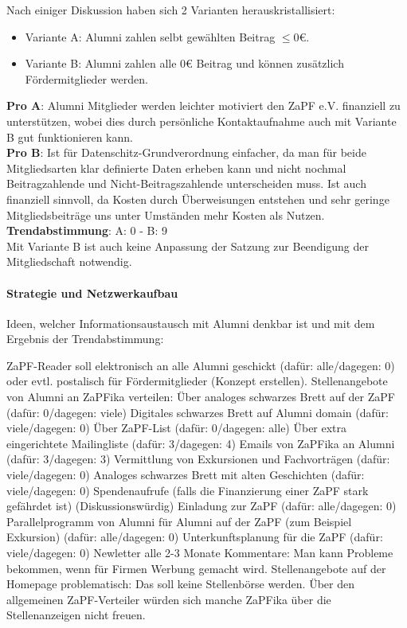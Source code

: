       Nach einiger Diskussion haben sich 2 Varianten herauskristallisiert:
      \begin{itemize}
        \item Variante A: Alumni zahlen selbt gewählten Beitrag $\leq 0 \euro$.
        \item Variante B: Alumni zahlen alle $0 \euro$ Beitrag und können zusätzlich Fördermitglieder werden.
      \end{itemize}
      \textbf{Pro A}: Alumni Mitglieder werden leichter motiviert den ZaPF e.V. finanziell zu unterstützen, wobei dies durch persönliche Kontaktaufnahme auch mit Variante B gut funktionieren kann. \\
      \textbf{Pro B}: Ist für Datenschitz-Grundverordnung einfacher, da man für beide Mitgliedsarten klar definierte Daten erheben kann und nicht nochmal Beitragzahlende und Nicht-Beitragszahlende unterscheiden muss. Ist auch finanziell sinnvoll, da Kosten durch Überweisungen entstehen und sehr geringe Mitgliedsbeiträge uns unter Umständen mehr Kosten als Nutzen. \\

      \textbf{Trendabstimmung}: A: 0 -  B: 9 \\

      Mit Variante B ist auch keine Anpassung der Satzung zur Beendigung der Mitgliedschaft notwendig. \\

      \paragraph{Strategie und Netzwerkaufbau}
        Ideen, welcher Informationsaustausch mit Alumni denkbar ist und mit dem Ergebnis der Trendabstimmung:
        \begin{outline}
          \1 ZaPF-Reader soll elektronisch an alle Alumni geschickt (dafür: alle/dagegen: 0) oder evtl. postalisch für Fördermitglieder (Konzept erstellen).
          \1 Stellenangebote von Alumni an ZaPFika verteilen:
            \2 Über analoges schwarzes Brett auf der ZaPF (dafür: 0/dagegen: viele)
            \2 Digitales schwarzes Brett auf Alumni domain (dafür: viele/dagegen: 0)
            \2 Über ZaPF-List (dafür: 0/dagegen: alle)
            \2 Über extra eingerichtete Mailingliste (dafür: 3/dagegen: 4)
            \2 Emails von ZaPFika an Alumni (dafür: 3/dagegen: 3)
          \1 Vermittlung von Exkursionen und Fachvorträgen (dafür: viele/dagegen: 0)
          \1 Analoges schwarzes Brett mit alten Geschichten (dafür: viele/dagegen: 0)
          \1 Spendenaufrufe (falls die Finanzierung einer ZaPF stark gefährdet ist) (Diskussionswürdig)
          \1 Einladung zur ZaPF (dafür: alle/dagegen: 0)
          \1 Parallelprogramm von Alumni für Alumni auf der ZaPF (zum Beispiel Exkursion) (dafür: alle/dagegen: 0)
          \1 Unterkunftsplanung für die ZaPF (dafür: viele/dagegen: 0)
          \1 Newletter alle 2-3 Monate
          \1 Kommentare: Man kann Probleme bekommen, wenn für Firmen Werbung gemacht wird. Stellenangebote auf der Homepage problematisch: Das soll keine Stellenbörse werden. Über den allgemeinen ZaPF-Verteiler würden sich manche ZaPFika über die Stellenanzeigen nicht freuen.
        \end{outline}


